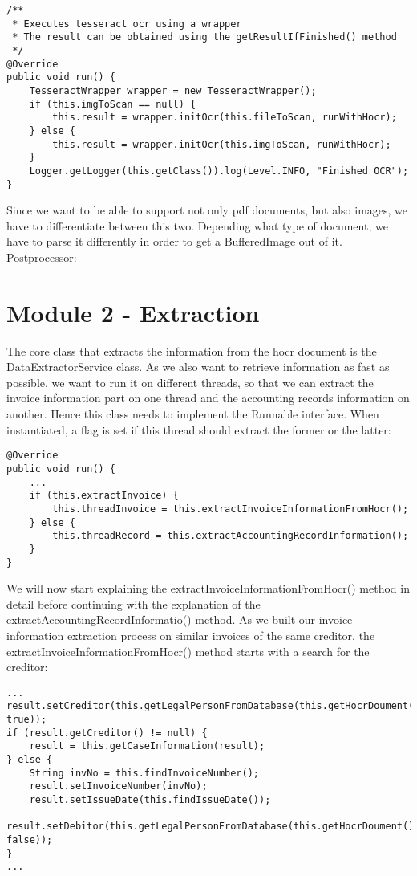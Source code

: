 \begin{lstlisting}
/**
 * Executes tesseract ocr using a wrapper
 * The result can be obtained using the getResultIfFinished() method
 */
@Override
public void run() {
    TesseractWrapper wrapper = new TesseractWrapper();
    if (this.imgToScan == null) {
        this.result = wrapper.initOcr(this.fileToScan, runWithHocr);
    } else {
        this.result = wrapper.initOcr(this.imgToScan, runWithHocr);
    }
    Logger.getLogger(this.getClass()).log(Level.INFO, "Finished OCR");
}
\end{lstlisting}

Since we want to be able to support not only pdf documents, but also images, we have to differentiate between this two. Depending what type of document, we have to parse it differently in order to get a BufferedImage out of it.
Postprocessor: %

\section{Module 2 - Extraction}

The core class that extracts the information from the hocr document is the DataExtractorService class. As we also want to retrieve information as fast as possible, we want to run it on different threads, so that we can extract the invoice information part on one thread and the accounting records information on another. Hence this class needs to implement the Runnable interface. When instantiated, a flag is set if this thread should extract the former or the latter:

\begin{lstlisting}
@Override
public void run() {
    ...
    if (this.extractInvoice) {
        this.threadInvoice = this.extractInvoiceInformationFromHocr();
    } else {
        this.threadRecord = this.extractAccountingRecordInformation();
    }
}
\end{lstlisting}

We will now start explaining the extractInvoiceInformationFromHocr() method in detail before continuing with the explanation of the extractAccountingRecordInformatio() method.
As we built our invoice information extraction process on similar invoices of the same creditor, the extractInvoiceInformationFromHocr() method starts with a search for the creditor:

\begin{lstlisting}
...
result.setCreditor(this.getLegalPersonFromDatabase(this.getHocrDoument(), true));
if (result.getCreditor() != null) {
    result = this.getCaseInformation(result);
} else {
    String invNo = this.findInvoiceNumber();
    result.setInvoiceNumber(invNo);
    result.setIssueDate(this.findIssueDate());
    result.setDebitor(this.getLegalPersonFromDatabase(this.getHocrDoument(), false));
}
...
\end{lstlisting}

